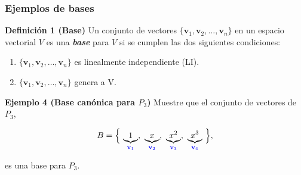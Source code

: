 {\nologo
\begin{frame}\frametitle{Ejemplos de bases}

\begin{block}{\textbf{Definición 1 (Base)}}
	\justifying
	Un conjunto de vectores $\{\mathbf{v}_1, \mathbf{v}_2, \hdots , \mathbf{v}_n \}$ en un espacio vectorial $V$ es 
	una \textbf{\textit{base}} para $V$ si se cumplen las dos siguientes condiciones:
	\begin{enumerate}
		\item[\labelname{$a$}] $\{\mathbf{v}_1, \mathbf{v}_2, \hdots , \mathbf{v}_n \}$ es linealmente independiente (LI).
		\item[\labelname{$b$}] $\{\mathbf{v}_1, \mathbf{v}_2, \hdots , \mathbf{v}_n \}$ genera a V.
	\end{enumerate}
\end{block}


\begin{ej}{\textbf{Ejemplo 4 (Base canónica para $P_3$)}} \justifying
	Muestre que el conjunto de vectores de $P_3$,
	
	\vspace{-2mm}
	\[
	B = \Big\{ \, \underbrace{1}_{\color{blue}\mathbf{v}_1}, \ \underbrace{x}_{\color{blue}\mathbf{v}_2}
	, \ \underbrace{x^2}_{\color{blue}\mathbf{v}_3}, \ \underbrace{x^3}_{\color{blue}\mathbf{v}_4} \, \Big\},
	\]
	
	\vspace{-2mm}
	es una base para $P_3$.
\end{ej}	

\end{frame}
}


\subsection{}

